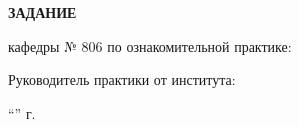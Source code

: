 \begin{center}
\bfseries{\large ЗАДАНИЕ}
\end{center}

кафедры № 806 по ознакомительной практике:

\vspace*{\fill}
Руководитель практики от института:

\vspace{5pt}
\enquote{\hspace{0.5cm}}  \the\year г.\hfill {}
\pagebreak

